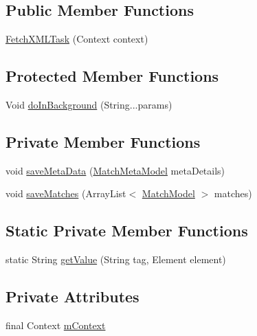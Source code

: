 \subsection*{Public Member Functions}
\begin{DoxyCompactItemize}
\item 
\hyperlink{classorg_1_1buildmlearn_1_1matchtemplate_1_1data_1_1FetchXMLTask_a733dae8a3e321c323e674ad8e9349cfc}{Fetch\+X\+M\+L\+Task} (Context context)
\end{DoxyCompactItemize}
\subsection*{Protected Member Functions}
\begin{DoxyCompactItemize}
\item 
Void \hyperlink{classorg_1_1buildmlearn_1_1matchtemplate_1_1data_1_1FetchXMLTask_ae32a490c1313e98d14dd369875317d77}{do\+In\+Background} (String...\+params)
\end{DoxyCompactItemize}
\subsection*{Private Member Functions}
\begin{DoxyCompactItemize}
\item 
void \hyperlink{classorg_1_1buildmlearn_1_1matchtemplate_1_1data_1_1FetchXMLTask_a1c1dbe7e5870fd50ac552909810a67a9}{save\+Meta\+Data} (\hyperlink{classorg_1_1buildmlearn_1_1matchtemplate_1_1data_1_1MatchMetaModel}{Match\+Meta\+Model} meta\+Details)
\item 
void \hyperlink{classorg_1_1buildmlearn_1_1matchtemplate_1_1data_1_1FetchXMLTask_a4b01068c0034e6e28c483083f191fcfc}{save\+Matches} (Array\+List$<$ \hyperlink{classorg_1_1buildmlearn_1_1matchtemplate_1_1data_1_1MatchModel}{Match\+Model} $>$ matches)
\end{DoxyCompactItemize}
\subsection*{Static Private Member Functions}
\begin{DoxyCompactItemize}
\item 
static String \hyperlink{classorg_1_1buildmlearn_1_1matchtemplate_1_1data_1_1FetchXMLTask_a646b5473e725aadbb51c7b2a85cae5c3}{get\+Value} (String tag, Element element)
\end{DoxyCompactItemize}
\subsection*{Private Attributes}
\begin{DoxyCompactItemize}
\item 
final Context \hyperlink{classorg_1_1buildmlearn_1_1matchtemplate_1_1data_1_1FetchXMLTask_a57346838cb912846315ee7398274c6bf}{m\+Context}
\end{DoxyCompactItemize}


